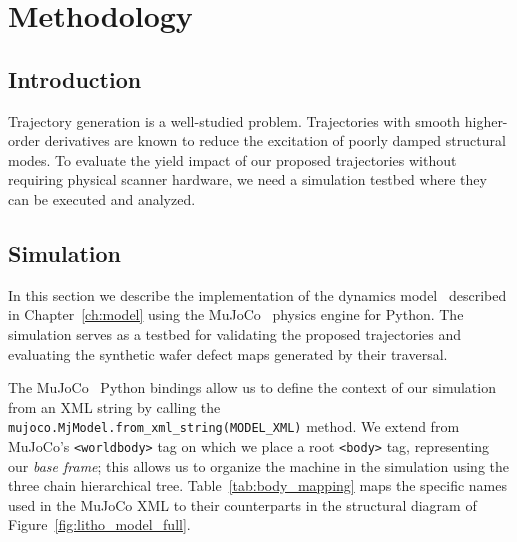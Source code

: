 \def\baselinestretch{1}

\chapter{Methodology}\label{ch:methodology}

\def\baselinestretch{1.66}

\section{Introduction}\label{sec:methodology_introduction}

Trajectory generation is a well-studied problem. Trajectories with smooth higher-order derivatives are known to reduce the excitation of poorly damped structural modes. To evaluate the yield impact of our proposed trajectories without requiring physical scanner hardware, we need a simulation testbed where they can be executed and analyzed.

\section{Simulation}\label{sec:methodology_simulation}

In this section we describe the implementation of the dynamics model~\cite{Al-Rawashdeh2022_Caracterization} described in Chapter~\ref{ch:model} using the MuJoCo~\cite{todorov2012mujoco} physics engine for Python. The simulation serves as a testbed for validating the proposed trajectories and evaluating the synthetic wafer defect maps generated by their traversal.

The MuJoCo~\cite{todorov2012mujoco} Python bindings allow us to define the context of our simulation from an XML string by calling the \texttt{mujoco.MjModel.from\_xml\_string(MODEL\_XML)} method. We extend from MuJoCo's \texttt{<worldbody>} tag on which we place a root \texttt{<body>} tag, representing our \textit{base frame}; this allows us to organize the machine in the simulation using the three chain hierarchical tree. Table~\ref{tab:body_mapping} maps the specific names used in the MuJoCo XML to their counterparts in the structural diagram of Figure~\ref{fig:litho_model_full}.

